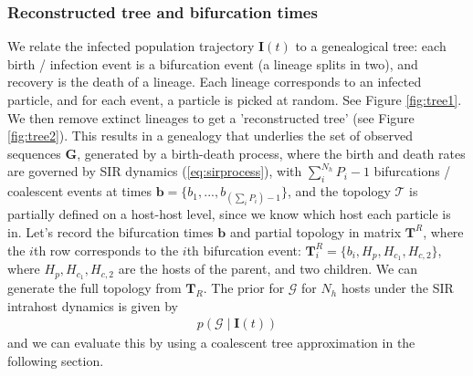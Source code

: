 \documentclass[]{report}
\begin{document}
\subsubsection{Reconstructed tree and bifurcation times}
We relate the infected population trajectory $\mathbf{I}(t)$ to a genealogical tree: each birth / infection event is a bifurcation event (a lineage splits in two), and recovery is the death of a lineage. Each lineage corresponds to an infected particle, and for each event, a particle is picked at random.
See Figure \ref{fig:tree1}. We then remove extinct lineages to get a 'reconstructed tree' (see Figure \ref{fig:tree2}). This results in a genealogy that underlies the set of observed sequences  $\mathbf{G}$, generated by a birth-death process, where the birth and death rates are governed by SIR dynamics (\ref{eq:sirprocess}), with  $\sum_i^{N_h} P_i - 1$ bifurcations / coalescent events at times $\mathbf{b}=\{b_1,...,b_{(\sum_i P_i)-1}\}$, and the topology $\mathcal{T}$ is partially defined on a host-host level, since we know which host each particle is in. Let's record the bifurcation times $\mathbf{b}$ and partial topology in matrix $\mathbf{T}^R$, where the $i$th row corresponds to the $i$th bifurcation event: $\mathbf{T}^R_i=\{b_i, H_p, H_{c_1}, H_{c,2}\}$, where $H_p, H_{c_1}, H_{c,2}$ are the hosts of the parent, and two children. We can generate the full topology from $\mathbf{T}_R$. The prior for $\mathcal{G}$ for $N_h$ hosts under the SIR intrahost dynamics is given by 
\begin{eqnarray}
p(\mathcal{G}\mid \mathbf{I}(t)) \label{eq:ll1}
\end{eqnarray}
and we can evaluate this by using a coalescent tree approximation in the following section.
\end{document}
